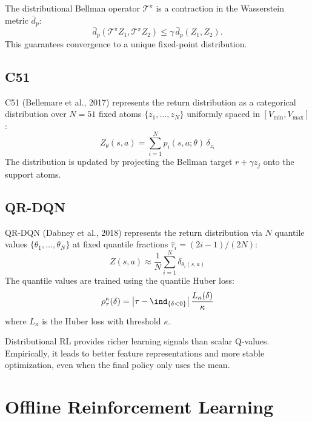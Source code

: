 \begin{theorem}
The distributional Bellman operator $\mathcal{T}^\pi$ is a contraction
in the Wasserstein metric $\bar{d}_p$:
\[
    \bar{d}_p(\mathcal{T}^\pi Z_1, \mathcal{T}^\pi Z_2)
    \leq \gamma \, \bar{d}_p(Z_1, Z_2).
\]
This guarantees convergence to a unique fixed-point distribution.
\end{theorem}

\subsection{C51}

\begin{definition}[C51]
C51 (Bellemare et al., 2017) represents the return distribution as a
categorical distribution over $N = 51$ fixed atoms
$\{z_1, \ldots, z_N\}$ uniformly spaced in $[V_{\min}, V_{\max}]$:
\[
    Z_\theta(s,a) = \sum_{i=1}^{N} p_i(s,a;\theta) \, \delta_{z_i}
\]
The distribution is updated by projecting the Bellman target
$r + \gamma z_j$ onto the support atoms.
\end{definition}

\subsection{QR-DQN}

\begin{definition}
QR-DQN (Dabney et al., 2018) represents the return distribution via $N$
quantile values $\{\theta_1, \ldots, \theta_N\}$ at fixed quantile
fractions $\hat{\tau}_i = (2i-1)/(2N)$:
\[
    Z(s,a) \approx \frac{1}{N} \sum_{i=1}^{N} \delta_{\theta_i(s,a)}
\]
The quantile values are trained using the quantile Huber loss:
\[
    \rho_\tau^\kappa(\delta) = \abs{\tau - \ind_{\{\delta < 0\}}}
    \frac{L_\kappa(\delta)}{\kappa}
\]
where $L_\kappa$ is the Huber loss with threshold $\kappa$.
\end{definition}

\begin{remark}
Distributional RL provides richer learning signals than scalar Q-values.
Empirically, it leads to better feature representations and more stable
optimization, even when the final policy only uses the mean.
\end{remark}

\section{Offline Reinforcement Learning}
\label{sec:offline}

